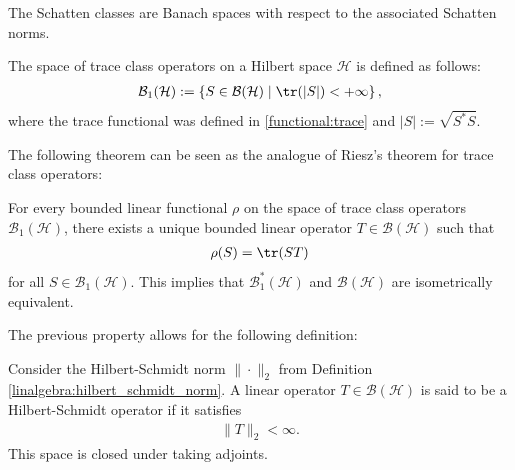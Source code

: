     \begin{property}
        The Schatten classes are Banach spaces with respect to the associated Schatten norms.
    \end{property}

    \begin{example}
        The space of trace class operators on a Hilbert space $\mathcal{H}$ is defined as follows:
        \begin{gather}
            \mathcal{B}_1(\mathcal{H}) := \{S\in\mathcal{B}(\mathcal{H})\mid\tr(|S|)<+\infty\}\,,
        \end{gather}
        where the trace functional was defined in \ref{functional:trace} and $|S|:=\sqrt{S^*S}$.
    \end{example}
    The following theorem can be seen as the analogue of Riesz's theorem for trace class operators:
    \begin{property}
        For every bounded linear functional $\rho$ on the space of trace class operators $\mathcal{B}_1(\mathcal{H})$, there exists a unique bounded linear operator $T\in\mathcal{B}(\mathcal{H})$ such that
        \begin{gather}
            \rho(S) = \tr(ST)
        \end{gather}
        for all $S\in\mathcal{B}_1(\mathcal{H})$. This implies that $\mathcal{B}^*_1(\mathcal{H})$ and $\mathcal{B}(\mathcal{H})$ are isometrically equivalent.
    \end{property}

    The previous property allows for the following definition:

    \begin{example}\label{functional:hilbert_schmidt}
        Consider the Hilbert-Schmidt norm $\|\cdot\|_2$ from Definition \ref{linalgebra:hilbert_schmidt_norm}. A linear operator $T\in\mathcal{B}(\mathcal{H})$ is said to be a Hilbert-Schmidt operator if it satisfies
        \begin{gather}
            \|T\|_2<\infty.
        \end{gather}
        This space is closed under taking adjoints.
    \end{example}

